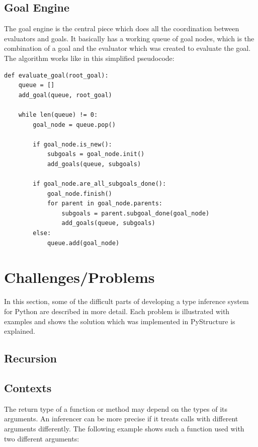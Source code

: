 \documentclass[12pt,halfparskip]{scrreprt}
\begin{document}
\subsection{Goal Engine}

The goal engine is the central piece which does all the coordination between evaluators and goals. It basically has a working queue of goal nodes, which is the combination of a goal and the evaluator which was created to evaluate the goal. The algorithm works like in this simplified pseudocode:

\begin{lstlisting}
def evaluate_goal(root_goal):
    queue = []
    add_goal(queue, root_goal)

    while len(queue) != 0:
        goal_node = queue.pop()

        if goal_node.is_new():
            subgoals = goal_node.init()
            add_goals(queue, subgoals)

        if goal_node.are_all_subgoals_done():
            goal_node.finish()
            for parent in goal_node.parents:
                subgoals = parent.subgoal_done(goal_node)
                add_goals(queue, subgoals)
        else:
            queue.add(goal_node)
\end{lstlisting}


\section{Challenges/Problems}

In this section, some of the difficult parts of developing a type inference system for Python are described in more detail. Each problem is illustrated with examples and shows the solution which was implemented in PyStructure is explained.

\subsection{Recursion}


\subsection{Contexts}

The return type of a function or method may depend on the types of its arguments. An inferencer can be more precise if it treats calls with different arguments differently. The following example shows such a function used with two different arguments:
\end{document}
